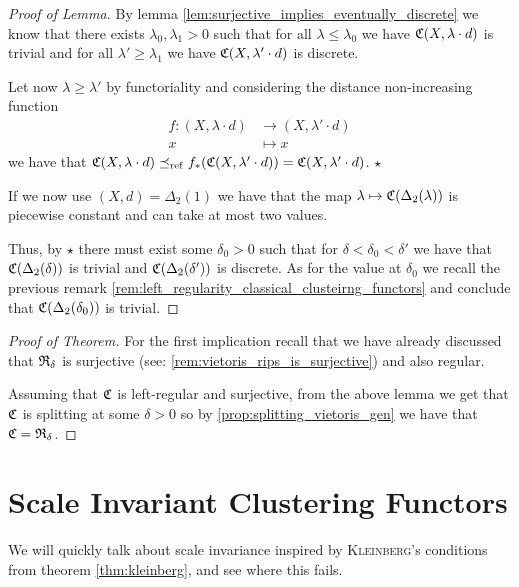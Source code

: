 \begin{proof}[Proof of Lemma]
    By lemma \ref{lem:surjective_implies_eventually_discrete} we know that there exists $\lambda_0, \lambda_1 > 0$ such that for all $\lambda \le \lambda_0$ we have $\mathfrak{C}(X, \lambda \cdot d)$ is trivial and for all $\lambda' \ge \lambda_1$ we have $\mathfrak{C}(X, \lambda' \cdot d)$ is discrete.

    Let now $\lambda \ge \lambda'$ by functoriality and considering the distance non-increasing function
    \begin{align*}
        f: (X, \lambda \cdot d) &\longrightarrow (X, \lambda' \cdot d)\\
        x &\longmapsto x
    \end{align*}
    we have that $\mathfrak{C}(X, \lambda \cdot d) \preceq_\mathrm{ref} f_*(\mathfrak{C}(X, \lambda' \cdot d)) = \mathfrak{C}(X, \lambda' \cdot d)$. $\star$

    If we now use $(X,d) = \Delta_2(1)$ we have that the map $\lambda \mapsto \mathfrak{C}(\Delta_2(\lambda))$ is piecewise constant and can take at most two values.

    Thus, by $\star$ there must exist some $\delta_0 > 0$ such that for $\delta < \delta_0 < \delta'$ we have that $\mathfrak{C}(\Delta_2(\delta))$ is trivial and $\mathfrak{C}(\Delta_2(\delta'))$ is discrete.
    As for the value at $\delta_0$ we recall the previous remark \ref{rem:left_regularity_classical_clusteirng_functors} and conclude that $\mathfrak{C}(\Delta_2(\delta_0))$ is trivial.
\end{proof}

\begin{proof}[Proof of Theorem]
    For the first implication recall that we have already discussed that $\mathfrak{R}_\delta$ is surjective (see: \ref{rem:vietoris_rips_is_surjective}) and also regular.

    Assuming that $\mathfrak{C}$ is left-regular and surjective, from the above lemma we get that $\mathfrak{C}$ is splitting at some $\delta > 0$ so by \ref{prop:splitting_vietoris_gen} we have that $\mathfrak{C} = \mathfrak{R}_{\delta}$.
\end{proof}

\section{Scale Invariant Clustering Functors}

We will quickly talk about scale invariance inspired by \textsc{Kleinberg}'s conditions from theorem \ref{thm:kleinberg}, and see where this fails. \source

